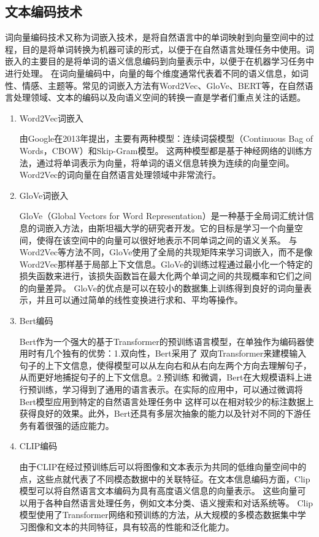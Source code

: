 \subsection{文本编码技术}
词向量编码技术又称为词嵌入技术，是将自然语言中的单词映射到向量空间中的过程，目的是将单词转换为机器可读的形式，以便于在自然语言处理任务中使用。词嵌入的主要目的是将单词的语义信息编码到向量表示中，以便于在机器学习任务中进行处理。
在词向量编码中，向量的每个维度通常代表着不同的语义信息，如词性、情感、主题等。常见的词嵌入方法有Word2Vec、GloVe、BERT等，在自然语言处理领域、文本的编码以及向语义空间的转换一直是学者们重点关注的话题。
\begin{enumerate}[topsep = 0 pt, itemsep= 0 pt, parsep=0pt, partopsep=0pt, leftmargin=0pt, itemindent=44pt, labelsep=6pt, listparindent=22pt, label=(\arabic*)]
	\item Word2Vec词嵌入
	
	由Google在2013年提出\cite{mikolov2013efficient,mikolov2013distributed}，主要有两种模型：连续词袋模型（Continuous Bag of Words，CBOW）和Skip-Gram模型。
	这两种模型都是基于神经网络的训练方法，通过将单词表示为向量，将单词的语义信息转换为连续的向量空间。Word2Vec的词向量在自然语言处理领域中非常流行。
	\item GloVe词嵌入
	
	GloVe（Global Vectors for Word Representation）是一种基于全局词汇统计信息的词嵌入方法\cite{pennington2014glove}，由斯坦福大学的研究者开发。它的目标是学习一个向量空间，使得在该空间中的向量可以很好地表示不同单词之间的语义关系。
	与Word2Vec等方法不同，GloVe使用了全局的共现矩阵来学习词嵌入，而不是像Word2Vec那样基于局部上下文信息。GloVe的训练过程通过最小化一个特定的损失函数来进行，该损失函数旨在最大化两个单词之间的共现概率和它们之间的向量差异。
	GloVe的优点是可以在较小的数据集上训练得到良好的词向量表示，并且可以通过简单的线性变换进行求和、平均等操作。
	\item Bert编码
	
	Bert作为一个强大的基于Transformer的预训练语言模型\cite{devlin2018bert}，在单独作为编码器使用时有几个独有的优势：1.双向性，Bert采用了
	双向Transformer来建模输入句子的上下文信息，使得模型可以从左向右和从右向左两个方向去理解句子，从而更好地捕捉句子的上下文信息。2.预训练
	和微调，Bert在大规模语料上进行预训练，学习得到了通用的语言表示。在实际的应用中，可以通过微调将Bert模型应用到特定的自然语言处理任务中
	这样可以在相对较少的标注数据上获得良好的效果。此外，Bert还具有多层次抽象的能力以及针对不同的下游任务有着很强的适应能力。
	\item CLIP编码
	
	由于CLIP在经过预训练后可以将图像和文本表示为共同的低维向量空间中的点，这些点就代表了不同模态数据中的关联特征。在文本信息编码方面，Clip模型可以将自然语言文本编码为具有高度语义信息的向量表示。
	这些向量可以用于各种自然语言处理任务，例如文本分类、语义搜索和对话系统等。 Clip模型使用了Transformer网络和预训练的方法，从大规模的多模态数据集中学习图像和文本的共同特征，具有较高的性能和泛化能力。
\end{enumerate}

